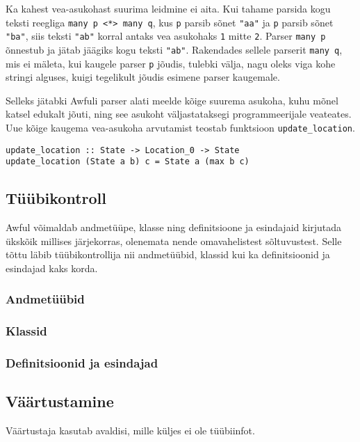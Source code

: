\documentclass[12pt]{article}
\begin{document}
      Ka kahest vea-asukohast suurima leidmine ei aita. Kui tahame parsida kogu teksti reegliga \verb!many p <*> many q!, kus \verb!p! parsib sõnet \verb!"aa"! ja \verb!p! parsib sõnet \verb!"ba"!, siis teksti \verb!"ab"! korral antaks vea asukohaks \verb!1! mitte \verb!2!. Parser \verb!many p! õnnestub ja jätab jäägiks kogu teksti \verb!"ab"!. Rakendades sellele parserit \verb!many q!, mis ei mäleta, kui kaugele parser \verb!p! jõudis, tulebki välja, nagu oleks viga kohe stringi alguses, kuigi tegelikult jõudis esimene parser kaugemale.

      Selleks jätabki Awfuli parser alati meelde kõige suurema asukoha, kuhu mõnel katsel edukalt jõuti, ning see asukoht väljastataksegi programmeerijale veateates. Uue kõige kaugema vea-asukoha arvutamist teostab funktsioon \verb!update_location!.

        \begin{verbatim}update_location :: State -> Location_0 -> State
update_location (State a b) c = State a (max b c)\end{verbatim}
    \subsection{Tüübikontroll}
      Awful võimaldab andmetüüpe, klasse ning definitsioone ja esindajaid kirjutada ükskõik millises järjekorras, olenemata nende omavahelistest sõltuvustest. Selle tõttu läbib tüübikontrollija nii andmetüübid, klassid kui ka definitsioonid ja esindajad kaks korda.
      \subsubsection{Andmetüübid}
        
      \subsubsection{Klassid}
        
      \subsubsection{Definitsioonid ja esindajad}
        
    \subsection{Väärtustamine}
      Väärtustaja kasutab avaldisi, mille küljes ei ole tüübiinfot.
\begin{comment}
    Add_Int_expression_2 |
    Add_Int'_expression_2 Integer |
    Algebraic_expression_2 String [Expression_2] |
    Application_expression_2 Expression_2 Expression_2 |
    Field_expression_2 String |
    Function_expression_2 Pattern_0 Expression_2 |
    Match_expression_2 Expression_2 Matches_2 |
    Struct_expression_2 (Map' Expression_2) |
\end{comment}
\end{document}
